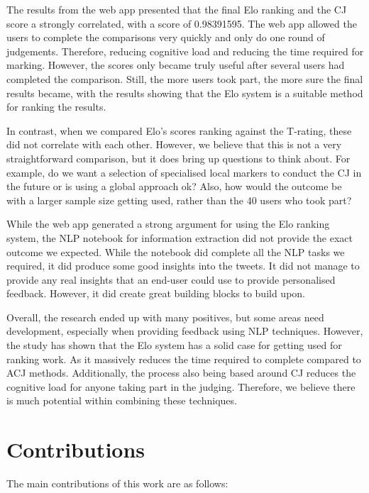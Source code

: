 The results from the web app presented that the final Elo ranking and the CJ score a strongly correlated, with a score of 0.98391595. The web app allowed the users to complete the comparisons very quickly and only do one round of judgements. Therefore, reducing cognitive load and reducing the time required for marking. However, the scores only became truly useful after several users had completed the comparison. Still, the more users took part, the more sure the final results became, with the results showing that the Elo system is a suitable method for ranking the results.

In contrast, when we compared Elo's scores ranking against the T-rating, these did not correlate with each other. However, we believe that this is not a very straightforward comparison, but it does bring up questions to think about. For example, do we want a selection of specialised local markers to conduct the CJ in the future or is using a global approach ok? Also, how would the outcome be with a larger sample size getting used, rather than the 40 users who took part?

While the web app generated a strong argument for using the Elo ranking system, the NLP notebook for information extraction did not provide the exact outcome we expected. While the notebook did complete all the NLP tasks we required, it did produce some good insights into the tweets. It did not manage to provide any real insights that an end-user could use to provide personalised feedback. However, it did create great building blocks to build upon.

Overall, the research ended up with many positives, but some areas need development, especially when providing feedback using NLP techniques. However, the study has shown that the Elo system has a solid case for getting used for ranking work. As it massively reduces the time required to complete compared to ACJ methods. Additionally, the process also being based around CJ reduces the cognitive load for anyone taking part in the judging. Therefore, we believe there is much potential within combining these techniques.


\section{Contributions} 
\label{sec:intro_contribs} 

The main contributions of this work are as follows: %

